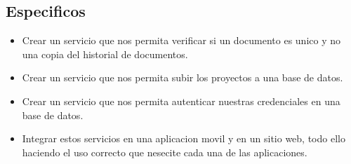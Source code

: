 \documentclass[%
 reprint,
 amsmath,amssymb,
 aps,
]{revtex4-1}
\begin{document}
\subsection {Especificos}
\begin{itemize}
\item Crear un servicio que nos permita verificar si un documento es unico y no una copia del historial de documentos.
\item Crear un servicio que nos permita subir los proyectos a una base de datos.
\item Crear un servicio que nos permita autenticar nuestras credenciales en una base de datos.
\item Integrar estos servicios en una aplicacion movil y en un sitio web, todo ello haciendo el uso correcto que nesecite cada una de las aplicaciones.
\end{itemize}
\end{document}
